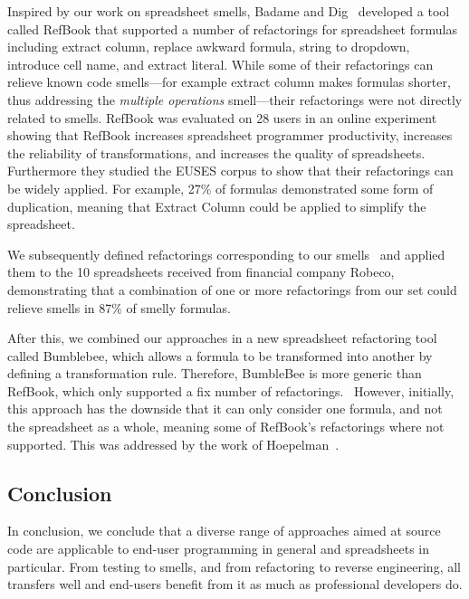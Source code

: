 \documentclass[conference]{IEEEtran}
\begin{document}
Inspired by our work on spreadsheet smells, Badame and Dig~\cite{badame_refactoring_2012} developed a tool called RefBook that supported a number of refactorings for spreadsheet formulas including extract column, replace awkward formula, string to dropdown, introduce cell name, and extract literal. While some of their refactorings can relieve known code smells---for example extract column makes formulas shorter, thus addressing the \emph{multiple operations} smell---their refactorings were not directly related to smells. RefBook was evaluated on 28 users in an online experiment showing that RefBook increases spreadsheet programmer
productivity, increases the reliability of transformations, and increases the quality of spreadsheets. Furthermore they studied the EUSES corpus to show that their refactorings can be widely applied. For example, 27\% of formulas demonstrated some form of duplication, meaning that Extract Column could be applied to simplify the spreadsheet.

We subsequently defined refactorings corresponding to our smells~\cite{hermans_detecting_2014} and applied them to the 10 spreadsheets received from financial company Robeco, demonstrating that a combination of one or more refactorings from our set could relieve smells in 87\% of smelly formulas.

After this, we combined our approaches in a new spreadsheet refactoring tool called Bumblebee, which allows a formula to be transformed into another by defining a transformation rule. Therefore, BumbleBee is more generic than RefBook, which only supported a fix number of refactorings.~\cite{hermans_bumblebee:_2014} However, initially, this approach has the downside that it can only consider one formula, and not the spreadsheet as a whole, meaning some of RefBook's refactorings  where not supported. This was addressed by the work of Hoepelman~\cite{hoepelman_thesis_2015}.

\subsection{Conclusion}
In conclusion, we conclude that a diverse range of approaches aimed at source code are applicable to end-user programming in general and spreadsheets in particular. From testing to smells, and from refactoring to reverse engineering, all transfers well and end-users benefit from it as much as professional developers do.

\end{document}
